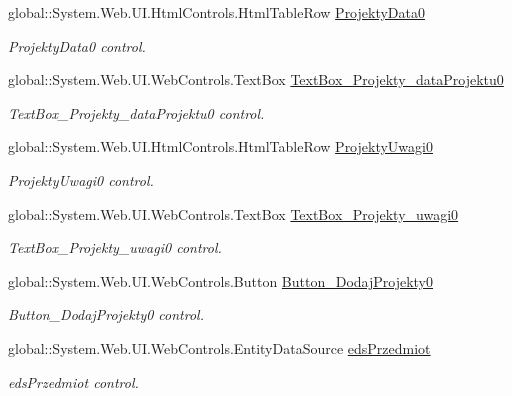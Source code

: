 \begin{DoxyCompactItemize}
global\+::\+System.\+Web.\+U\+I.\+Html\+Controls.\+Html\+Table\+Row \hyperlink{class_dziennik_ocen_web2_1_1_web_form1_a041f44ddf339d8b10a89bfcad55a58a7}{Projekty\+Data0}
\begin{DoxyCompactList}\small\item\em Projekty\+Data0 control. \end{DoxyCompactList}\item 
global\+::\+System.\+Web.\+U\+I.\+Web\+Controls.\+Text\+Box \hyperlink{class_dziennik_ocen_web2_1_1_web_form1_aebb640122d0045069b76a51dd72d86be}{Text\+Box\+\_\+\+Projekty\+\_\+data\+Projektu0}
\begin{DoxyCompactList}\small\item\em Text\+Box\+\_\+\+Projekty\+\_\+data\+Projektu0 control. \end{DoxyCompactList}\item 
global\+::\+System.\+Web.\+U\+I.\+Html\+Controls.\+Html\+Table\+Row \hyperlink{class_dziennik_ocen_web2_1_1_web_form1_a7242c14fa14fc26f3f1413d95e986d4f}{Projekty\+Uwagi0}
\begin{DoxyCompactList}\small\item\em Projekty\+Uwagi0 control. \end{DoxyCompactList}\item 
global\+::\+System.\+Web.\+U\+I.\+Web\+Controls.\+Text\+Box \hyperlink{class_dziennik_ocen_web2_1_1_web_form1_a8816d59dd0d3387f0bc5f4b22df7e73d}{Text\+Box\+\_\+\+Projekty\+\_\+uwagi0}
\begin{DoxyCompactList}\small\item\em Text\+Box\+\_\+\+Projekty\+\_\+uwagi0 control. \end{DoxyCompactList}\item 
global\+::\+System.\+Web.\+U\+I.\+Web\+Controls.\+Button \hyperlink{class_dziennik_ocen_web2_1_1_web_form1_a116551ad032492cd511786a64b19b21c}{Button\+\_\+\+Dodaj\+Projekty0}
\begin{DoxyCompactList}\small\item\em Button\+\_\+\+Dodaj\+Projekty0 control. \end{DoxyCompactList}\item 
global\+::\+System.\+Web.\+U\+I.\+Web\+Controls.\+Entity\+Data\+Source \hyperlink{class_dziennik_ocen_web2_1_1_web_form1_a24319b93de14462cd162625f5e6fc97e}{eds\+Przedmiot}
\begin{DoxyCompactList}\small\item\em eds\+Przedmiot control. \end{DoxyCompactList}\item 

\end{DoxyCompactItemize}
